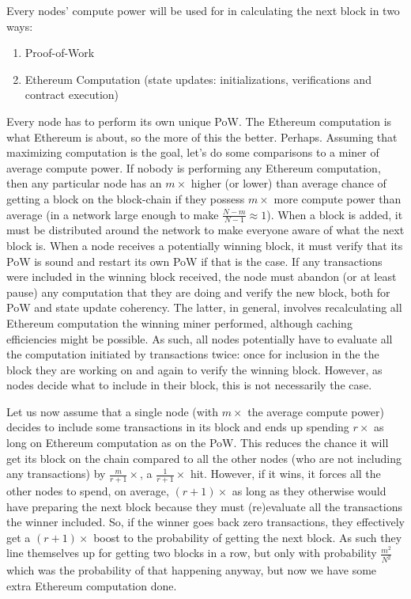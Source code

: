 \documentclass[10pt,a4paper]{article}
\begin{document}
Every nodes' compute power will be used for in calculating the next block in two ways:
\begin{enumerate} \itemsep=0pt
\item Proof-of-Work
\item Ethereum Computation (state updates: initializations, verifications and contract execution)
\end{enumerate}
Every node has to perform its own unique PoW. The Ethereum computation is what Ethereum is about, so the more of this the better. Perhaps. Assuming that maximizing computation is the goal, let's do some comparisons to a miner of average compute power. If nobody is performing any Ethereum computation, then any particular node has an $m\times$ higher (or lower) than average chance of getting a block on the block-chain if they possess $m\times$ more compute power than average (in a network large enough to make $\frac{N-m}{N-1}\approx 1$). When a block is added, it must be distributed around the network to make everyone aware of what the next block is. When a node receives a potentially winning block, it must verify that its PoW is sound and restart its own PoW if that is the case. If any transactions were included in the winning block received, the node must abandon (or at least pause) any computation that they are doing and verify the new block, both for PoW and state update coherency. The latter, in general, involves recalculating all Ethereum computation the winning miner performed, although caching efficiencies might be possible. As such, all nodes potentially have to evaluate all the computation initiated by transactions twice: once for inclusion in the the block they are working on and again to verify the winning block. However, as nodes decide what to include in their block, this is not necessarily the case.

Let us now assume that a single node (with $m\times$ the average compute power) decides to include some transactions in its block and ends up spending $r\times$ as long on Ethereum computation as on the PoW. This reduces the chance it will get its block on the chain compared to all the other nodes (who are not including any transactions) by $\frac{m}{r+1}\times$, \ie a $\frac{1}{r+1}\times$ hit. However, if it wins, it forces all the other nodes to spend, on average, $(r+1)\times$ as long as they otherwise would have preparing the next block because they must (re)evaluate all the transactions the winner included. So, if the winner goes back zero transactions, they effectively get a $(r+1)\times$ boost to the probability of getting the next block. As such they line themselves up for getting two blocks in a row, but only with probability $\frac{m^2}{N^2}$ which was the probability of that happening anyway, but now we have some extra Ethereum computation done.
\end{document}
